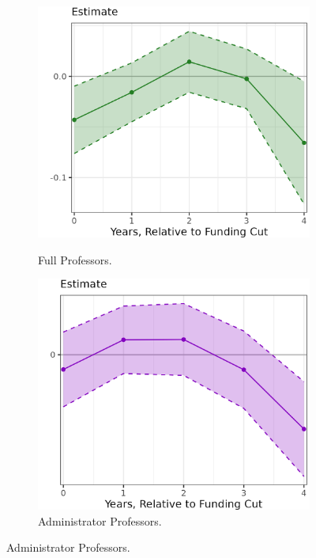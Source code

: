 \begin{figure}[H]
\begin{subfigure}[b]{0.495\textwidth}
        \label{fig:salaries-assistant-illinois-lp-rolling}
    \end{subfigure}
    \begin{subfigure}[b]{0.495\textwidth}
        \centering
        \caption{Full Professors.}
        \includegraphics[width=\textwidth]{figures/salaries-full-illinois-lp-rolling.png}
        \label{fig:salaries-full-illinois-lp-rolling}
    \end{subfigure}
    \begin{subfigure}[b]{0.495\textwidth}
        \centering
        \caption{Administrator Professors.}
        \includegraphics[width=\textwidth]{figures/salaries-administrator-illinois-lp-rolling.png}

\end{subfigure}
\end{figure}
